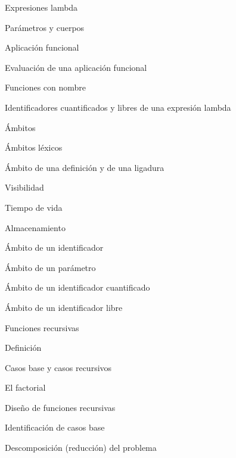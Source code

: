\begin{longenum}
\begin{longenum}
        \begin{longenum}
            \item Expresiones lambda
            \item Parámetros y cuerpos
            \item Aplicación funcional
            \begin{longenum}
                \item Evaluación de una aplicación funcional
                \item Funciones con nombre
            \end{longenum}
            \item Identificadores cuantificados y libres de una expresión lambda
        \end{longenum}
        \item Ámbitos
        \begin{longenum}
            \item Ámbitos léxicos
            \item Ámbito de una definición y de una ligadura
            \begin{longenum}
                \item Visibilidad
                \item Tiempo de vida
                \item Almacenamiento
            \end{longenum}
            \item Ámbito de un identificador
            \item Ámbito de un parámetro
            \item Ámbito de un identificador cuantificado
            \item Ámbito de un identificador libre
        \end{longenum}
        \item Funciones recursivas \opcional\
        \begin{longenum}
            \item Definición
            \item Casos base y casos recursivos
            \item El factorial
            \item Diseño de funciones recursivas
            \begin{longenum}
                \item Identificación de casos base
                \item Descomposición (reducción) del problema

\end{longenum}
\end{longenum}
\end{longenum}
\end{longenum}
